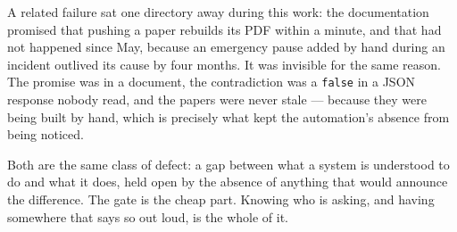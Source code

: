 \documentclass[10pt,letterpaper,twocolumn]{article}
\newcommand{\code}[1]{\texttt{#1}}
\begin{document}
A related failure sat one directory away during this work: the documentation
promised that pushing a paper rebuilds its PDF within a minute, and that had
not happened since May, because an emergency pause added by hand during an
incident outlived its cause by four months. It was invisible for the same
reason. The promise was in a document, the contradiction was a \code{false} in a
JSON response nobody read, and the papers were never stale --- because they were
being built by hand, which is precisely what kept the automation's absence from
being noticed.

Both are the same class of defect: a gap between what a system is understood to
do and what it does, held open by the absence of anything that would announce
the difference. The gate is the cheap part. Knowing who is asking, and having
somewhere that says so out loud, is the whole of it.



\end{document}
